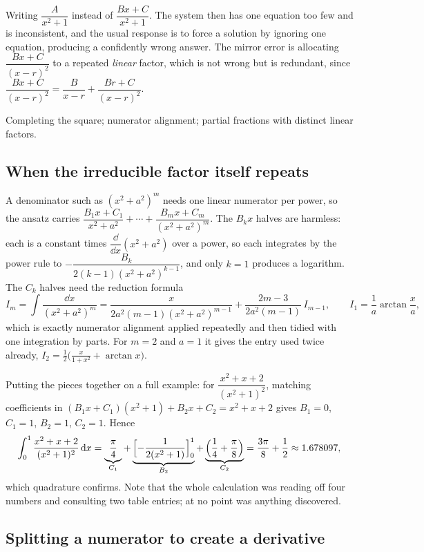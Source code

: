 \begin{trap}
Writing $\dfrac{A}{x^2+1}$ instead of $\dfrac{Bx+C}{x^2+1}$. The system then has one equation too few and is inconsistent, and the usual response is to force a solution by ignoring one equation, producing a confidently wrong answer. The mirror error is allocating $\dfrac{Bx+C}{(x-r)^2}$ to a repeated \emph{linear} factor, which is not wrong but is redundant, since $\dfrac{Bx+C}{(x-r)^2}=\dfrac{B}{x-r}+\dfrac{Br+C}{(x-r)^2}$.
\end{trap}

\begin{seealsob}Completing the square; numerator alignment; partial fractions with distinct linear factors.\end{seealsob}

\subsection{When the irreducible factor itself repeats}

A denominator such as $(x^2+a^2)^m$ needs one linear numerator per power, so the ansatz carries $\dfrac{B_1x+C_1}{x^2+a^2}+\cdots+\dfrac{B_mx+C_m}{(x^2+a^2)^m}$. The $B_kx$ halves are harmless: each is a constant times $\dfrac{\dd}{\dd x}(x^2+a^2)$ over a power, so each integrates by the power rule to $-\dfrac{B_k}{2(k-1)(x^2+a^2)^{k-1}}$, and only $k=1$ produces a logarithm. The $C_k$ halves need the reduction formula
\[
I_m=\int\frac{\dd x}{(x^2+a^2)^m}
=\frac{x}{2a^2(m-1)(x^2+a^2)^{m-1}}+\frac{2m-3}{2a^2(m-1)}\,I_{m-1},
\qquad I_1=\frac1a\arctan\frac xa ,
\]
which is exactly numerator alignment applied repeatedly and then tidied with one integration by parts. For $m=2$ and $a=1$ it gives the entry used twice already, $I_2=\tfrac12\bigl(\tfrac{x}{1+x^2}+\arctan x\bigr)$.

Putting the pieces together on a full example: for $\dfrac{x^2+x+2}{(x^2+1)^2}$, matching coefficients in $(B_1x+C_1)(x^2+1)+B_2x+C_2=x^2+x+2$ gives $B_1=0$, $C_1=1$, $B_2=1$, $C_2=1$. Hence
\[
\int_0^1\frac{x^2+x+2}{(x^2+1)^2}\,\mathrm{d} x
=\underbrace{\frac{\pi}{4}}_{C_1}
+\underbrace{\Bigl[-\frac{1}{2(x^2+1)}\Bigr]_0^1}_{B_2}
+\underbrace{\Bigl(\frac14+\frac{\pi}{8}\Bigr)}_{C_2}
=\frac{3\pi}{8}+\frac12\approx1.678097 ,
\]
which quadrature confirms. Note that the whole calculation was reading off four numbers and consulting two table entries; at no point was anything discovered.

\subsection{Splitting a numerator to create a derivative}

